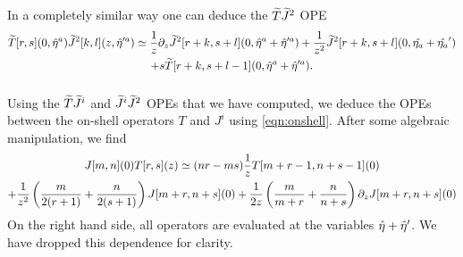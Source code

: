 \documentclass[../main.tex]{subfiles}
\begin{document}
In a completely similar way one can deduce the $\widetilde{T} \widetilde{J}^2$ OPE
\begin{multline}
\widetilde{T}[r,s](0,\Hat{\eta}^a) \widetilde{J}^2[k,l] (z,\Hat{\eta}'^a) \simeq \frac1z \partial_z \widetilde{J}^2[r+k,s+l](0,\Hat{\eta}^a + \Hat{\eta}'^a) + \frac{1}{z^2} \widetilde{J}^2[r+k,s+l](0,\Hat{\eta_a} + \Hat{\eta_a}')  \\ + s \widetilde{T}[r+k,s+l-1] (0,\Hat{\eta}^a + \Hat{\eta}'^a) .
\end{multline}

\subsubsection{}

Using the $\widetilde{T} \widetilde{J}^i$ and $\widetilde{J}^i \widetilde{J}^2$ OPEs that we have computed, we deduce the OPEs between the on-shell operators $T$ and $J^i$ using \eqref{eqn:onshell}.
After some algebraic manipulation, we find
\begin{multline}
J[m, n](0)T[r, s](z) \simeq (nr-ms) { 1\over z}T[m + r -1, n + s -1](0) \\ + {1 \over z^2}\left({m \over 2(r + 1)} + {n \over 2(s + 1)}\right)J[m + r, n + s](0)
+{1 \over 2 z}\left({m \over m + r} + {n \over n + s} \right)\partial_z J[m + r, n + s](0)
\end{multline}
On the right hand side, all operators are evaluated at the variables $\Hat{\eta} +\Hat{\eta}'$.  We have dropped this dependence for clarity.
\end{document}
